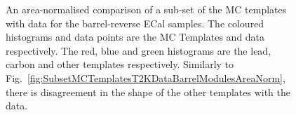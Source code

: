 \begin{figure}%
  \centering
  \caption{An area-normalised comparison of a sub-set of the MC templates with data for the barrel-reverse ECal samples.  The coloured histograms and data points are the MC Templates and data respectively.  The red, blue and green histograms are the lead, carbon and other templates respectively.  Similarly to Fig.~\ref{fig:SubsetMCTemplatesT2KDataBarrelModulesAreaNorm}, there is disagreement in the shape of the other templates with the data.}
  \label{fig:SubsetMCTemplatesT2KDataBarrelReverseModulesAreaNorm}
\end{figure}
